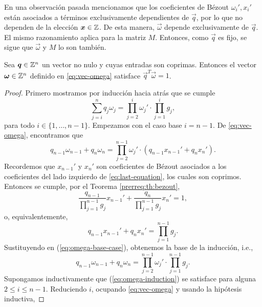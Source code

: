 En una observación pasada mencionamos que los coeficientes de Bézout $\omega_i', x_i'$ están
asociados a términos exclusivamente dependientes de $\vec{q}$, por lo que no dependen de la elección
$\boldsymbol{x} \in \mathbb{Z}$. De esta manera, $\vec{\omega}$ depende exclusivamente de $\vec{q}$. El mismo
razonamiento aplica para la matriz $M$. Entonces, como $\vec{q}$ es fijo, se sigue que
$\vec{\omega}$ y $M$ lo son también.

\begin{lemma} \label{lemma:iso1}
	Sea $\boldsymbol{q} \in \mathbb{Z}^{n}$ un vector no nulo y cuyas entradas son coprimas. Entonces el vector
	$\boldsymbol{\omega} \in \mathbb{Z}^n$ definido en \eqref{eq:vec-omega} satisface $\vec{q}^T\vec{\omega} = 1$.
\end{lemma}
\begin{proof}
	Primero mostramos por inducción hacia atrás que se cumple
	\begin{equation}
		\label{eq:omega-induction} \sum_{j=i}^{n}q_j\omega_j =
		\prod_{j=2}^{i}\omega_j' \cdot \prod_{j=1}^{i}g_j,
	\end{equation}
	para todo $i \in \lbrace 1, \ldots, n - 1\rbrace$. Empezamos con el caso base $i = n - 1$. De
	\eqref{eq:vec-omega}, encontramos que
	\begin{equation}
		\label{eq:omega-base-case}
		q_{n-1}\omega_{n-1} + q_n\omega_n =
		\prod_{j=2}^{n-1}\omega_j' \cdot \left(q_{n-1}x_{n-1}' + q_nx_n'\right).
	\end{equation}
	Recordemos que $x_{n-1}'$ y $x_n'$ son coeficientes de Bézout asociados a los coeficientes del
	lado izquierdo de \eqref{eq:last-equation}, los cuales son coprimos. Entonces se cumple, por el
	Teorema \ref{prerreq:th:bezout},
	\begin{equation*}
		\frac{q_{n-1}}{\prod_{j=1}^{n-1}g_j}x_{n-1}' +
		\frac{q_n}{\prod_{j=1}^{n-1}g_j}x_n' = 1,
	\end{equation*}
	o, equivalentemente,
	\begin{equation*}
		q_{n-1}x_{n-1}' + q_nx_n' = \prod_{j=1}^{n-1}g_j.
	\end{equation*}
	Sustituyendo en (\ref{eq:omega-base-case}), obtenemos la base de la inducción, i.e.,
	\begin{equation*}
		q_{n-1}\omega_{n-1} + q_n\omega_n  =
		\prod_{j=2}^{n-1}\omega_j' \cdot \prod_{j=1}^{n-1}g_j.
	\end{equation*}
	Supongamos inductivamente que (\ref{eq:omega-induction}) se satisface para alguna $2 \leq i \leq
	n - 1$. Reduciendo $i$, ocupando \eqref{eq:vec-omega} y usando la hipótesis inductiva,

\end{proof}
